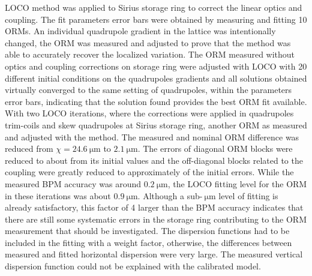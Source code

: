     LOCO method was applied to Sirius storage ring to correct the linear optics and coupling. The fit parameters error bars were obtained by measuring and fitting 10 ORMs. An individual quadrupole gradient in the lattice was intentionally changed, the ORM was measured and adjusted to prove that the method was able to accurately recover the localized variation. The ORM measured without optics and coupling corrections on storage ring were adjusted with LOCO with 20 different initial conditions on the quadrupoles gradients and all solutions obtained virtually converged to the same setting of quadrupoles, within the parameters error bars, indicating that the solution found provides the best ORM fit available. With two LOCO iterations, where the corrections were applied in quadrupoles trim-coils and skew quadrupoles at Sirius storage ring, another ORM as measured and adjusted with the method. The measured and nominal ORM difference was reduced from $\chi = \SI{24.6}{\micro\meter}$ to $\SI{2.1}{\micro\meter}$. The errors of diagonal ORM blocks were reduced to about  from its initial values and the off-diagonal blocks related to the coupling were greatly reduced to approximately  of the initial errors. While the measured BPM accuracy was around $\SI{0.2}{\micro\meter}$, the LOCO fitting level for the ORM in these iterations was about $\SI{0.9}{\micro\meter}$. Although a sub-$\SI{}{\micro\meter}$ level of fitting is already satisfactory, this factor of 4 larger than the BPM accuracy indicates that there are still some systematic errors in the storage ring contributing to the ORM measurement that should be investigated. The dispersion functions had to be included in the fitting with a weight factor, otherwise, the differences between measured and fitted horizontal dispersion were very large. The measured vertical dispersion function could not be explained with the calibrated model. 
    
